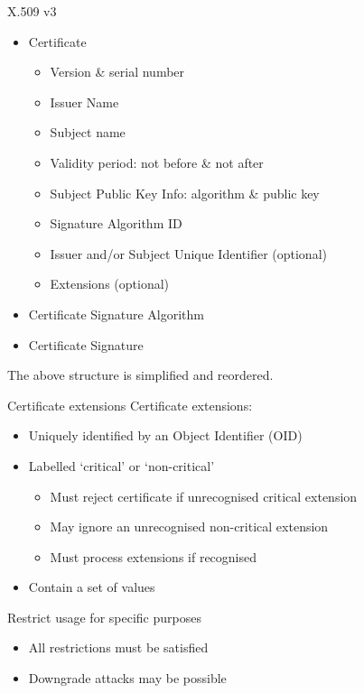 \begin{frame}{X.509 v3}
  \begin{itemize}[<+(1)->]
    \item Certificate
    \begin{itemize}
      \item Version \& serial number
      \item Issuer Name
      \item Subject name
      \item Validity period: not before \& not after
      \item Subject Public Key Info: algorithm \& public key
      \item Signature Algorithm ID
      \item Issuer and/or Subject Unique Identifier (optional)
      \item Extensions (optional)
    \end{itemize}
    \item Certificate Signature Algorithm
    \item Certificate Signature
  \end{itemize}

  \pause
  The above structure is simplified and reordered.
\end{frame}

\begin{frame}{Certificate extensions}
  Certificate extensions:
  \begin{itemize}[<+(1)->]
    \item Uniquely identified by an Object Identifier (OID)
    \item Labelled `critical' or `non-critical'
    \begin{itemize}
      \item Must reject certificate if unrecognised critical extension
      \item May ignore an unrecognised non-critical extension
      \item Must process extensions if recognised
    \end{itemize}
    \item Contain a set of values
  \end{itemize}

  \pause
  Restrict usage for specific purposes
  \begin{itemize}
    \item All restrictions must be satisfied
    \item Downgrade attacks may be possible
  \end{itemize}
\end{frame}

